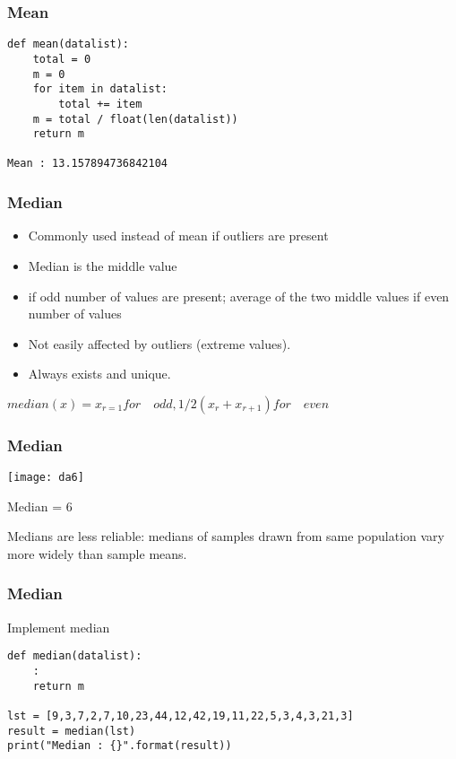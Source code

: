 \begin{frame}[fragile]\frametitle{Mean}
\begin{lstlisting}
def mean(datalist):
	total = 0
	m = 0
	for item in datalist:
		total += item
	m = total / float(len(datalist))
	return m

Mean : 13.157894736842104
\end{lstlisting}
\end{frame}

\begin{frame}[fragile]\frametitle{Median}	
\begin{itemize}
\item Commonly used instead of mean if outliers are present
\item Median is the middle value 
\item if odd number of values are present; average of the two middle values if even number of values
\item Not easily affected by outliers (extreme values). 
\item Always exists and unique.
\end{itemize}
$median(x) = x_{r=1} for \quad odd, 1/2(x_r + x_{r+1}) for \quad even$
\end{frame}


\begin{frame}[fragile]\frametitle{Median}	
\begin{center}
\texttt{[image: da6]}
\end{center}
Median = 6

Medians are less reliable: medians of samples drawn from same population vary more widely than sample means.
\end{frame}


\begin{frame}[fragile]\frametitle{Median}
Implement median
\begin{lstlisting}
def median(datalist):
	:
	return m

lst = [9,3,7,2,7,10,23,44,12,42,19,11,22,5,3,4,3,21,3]
result = median(lst)
print("Median : {}".format(result))
\end{lstlisting}
\end{frame}

